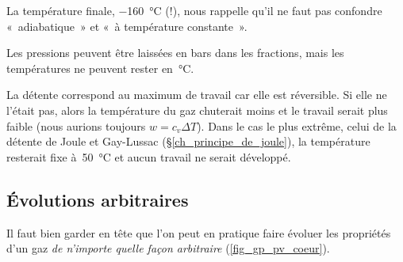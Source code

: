 \begin{anexample}
\begin{answer}
					\begin{remark}La température finale, \SI{-160}{\degreeCelsius} (!), nous rappelle qu’il ne faut pas confondre «~adiabatique~» et «~à température constante~».\end{remark}
					\begin{remark}Les pressions peuvent être laissées en \si{bars} dans les fractions, mais les températures ne peuvent rester en~\si{\degreeCelsius}.\end{remark}
					\begin{remark}La détente correspond au maximum de travail car elle est réversible. Si elle ne l’était pas, alors la température du gaz chuterait moins et le travail serait plus faible (nous aurions toujours $w = c_v \Delta T$). Dans le cas le plus extrême, celui de la détente de Joule et Gay-Lussac (\S\ref{ch_principe_de_joule}), la température resterait fixe à~\SI{50}{\degreeCelsius} et aucun travail ne serait développé.\end{remark}
				\end{answer}
		\end{anexample}

		
	\subsection{Évolutions arbitraires}
	
		Il faut bien garder en tête que l’on peut en pratique faire évoluer les propriétés d’un gaz \emph{de n’importe quelle façon arbitraire} (\cref{fig_gp_pv_coeur}).
		
